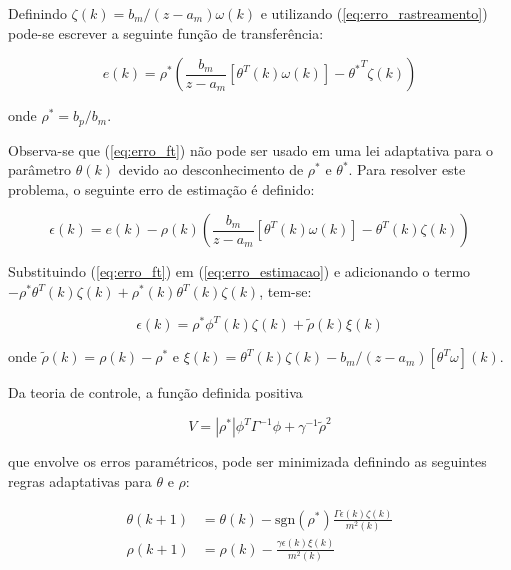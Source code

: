     Definindo $\zeta (k) = b_m / (z - a_m) \omega (k)$ e utilizando (\ref{eq:erro_rastreamento})
    pode-se escrever a seguinte função de transferência:

    \begin{equation}
        e(k) = \rho^* \left( \frac{b_m}{z - a_m} \left[ \theta^T (k) \omega (k) \right]
            - {\theta^*}^T \zeta (k) \right)
        \label{eq:erro_ft}
    \end{equation}

    onde $\rho^* = b_p / b_m$.

    Observa-se que (\ref{eq:erro_ft}) não pode ser usado em uma lei adaptativa para
    o parâmetro $\theta (k)$ devido ao desconhecimento de $\rho^*$ e $\theta^*$. Para
    resolver este problema, o seguinte erro de estimação é definido:

    \begin{equation}
        \epsilon (k) = e (k) - \rho(k) \left( \frac{b_m}{z - a_m} \left[ \theta^T (k) \omega(k)
            \right] - \theta^T (k) \zeta(k) \right)
        \label{eq:erro_estimacao}
    \end{equation}

    Substituindo (\ref{eq:erro_ft}) em (\ref{eq:erro_estimacao}) e adicionando o termo
    $-\rho^* \theta^T (k) \zeta (k) + \rho^* (k) \theta^T (k) \zeta(k)$, tem-se:

    \begin{equation}
        \epsilon(k) = \rho^* \phi^T(k) \zeta(k) + \tilde{\rho}(k) \xi(k)
        \label{eq:epsilon_k}
    \end{equation}

    onde $\tilde{\rho}(k) = \rho(k) - \rho^*$ e $\xi(k) = \theta^T(k) \zeta(k) -
    b_m / (z - a_m)[\theta^T \omega](k)$.

    Da teoria de controle, a função definida positiva

    \begin{equation}
        V = |\rho^*| \phi^T \Gamma^{-1} \phi + \gamma^{-1} {\tilde{\rho}}^2
        \label{eq:funcao_positiva}
    \end{equation}

    que envolve os erros paramétricos, pode ser minimizada definindo as seguintes
    regras adaptativas para $\theta$ e $\rho$:

    \begin{subequations}
        \begin{align}
            \theta(k + 1) & = \theta(k) - \text{sgn}(\rho^*)\frac{\Gamma \epsilon(k)\zeta(k)}{m^2(k)} \\
            \rho(k + 1) & = \rho(k) - \frac{\gamma \epsilon(k) \xi(k)}{m^2(k)}
        \end{align}
        \label{eq:regras_adaptativas}
    \end{subequations}

